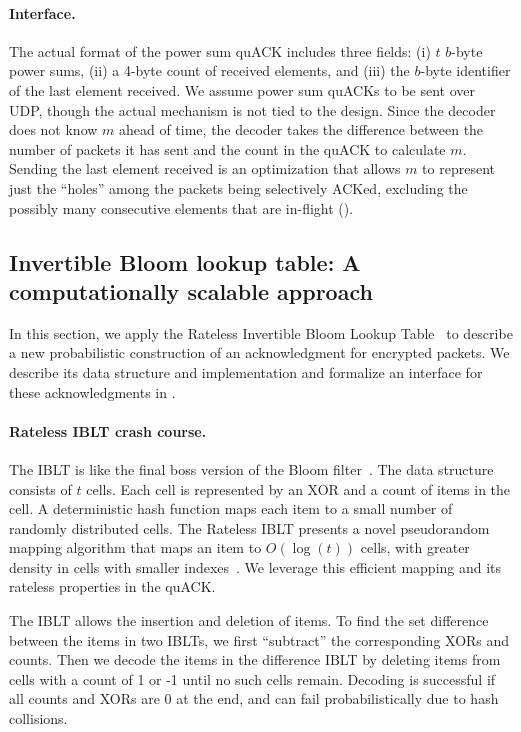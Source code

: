 \paragraph{Interface.}

The actual format of the power sum quACK includes three fields: (i) $t$ $b$-byte
power sums, (ii) a 4-byte count of received elements, and (iii) the $b$-byte
identifier of the last element received. We assume power sum quACKs to be sent
over UDP, though the actual mechanism is not tied to the design.
Since the decoder
does not know $m$ ahead of time, the decoder takes the difference between the
number of packets it has sent and the count in the quACK to calculate $m$.
Sending the last element received is an optimization that allows $m$ to
represent just the ``holes'' among the packets being selectively ACKed,
excluding the possibly many consecutive elements that are in-flight
().

\subsection{Invertible Bloom lookup table: A computationally scalable approach}
\label{sec:quack:constructions:iblt}


In this section, we apply
the Rateless Invertible Bloom Lookup Table~\cite{yang2024practical}
to describe a new probabilistic construction of an acknowledgment
for encrypted packets. We describe its data structure and implementation
and formalize an interface for these acknowledgments in .

\paragraph{Rateless IBLT crash course.} The IBLT is like the final boss version
 of the Bloom filter~\cite{goodrich2011invertible}. The data structure consists of $t$ cells. Each
 cell is represented by an XOR and a count of items in the cell. A
 deterministic hash function maps each item to a small number of randomly
 distributed cells. The Rateless IBLT presents a novel pseudorandom mapping
 algorithm that maps an item to $O(\log(t))$ cells, with greater density in
 cells with smaller indexes~\cite{yang2024practical}. We leverage this
 efficient mapping and its rateless properties in the quACK.

The IBLT allows the insertion and deletion of items. To find the set difference
between the items in two IBLTs, we first ``subtract'' the corresponding XORs
and counts. Then we decode the items in the difference IBLT by deleting items
from cells with a count of 1 or -1 until no such cells remain. Decoding is
successful if all counts and XORs are 0 at the end, and can fail
probabilistically due to hash collisions.

